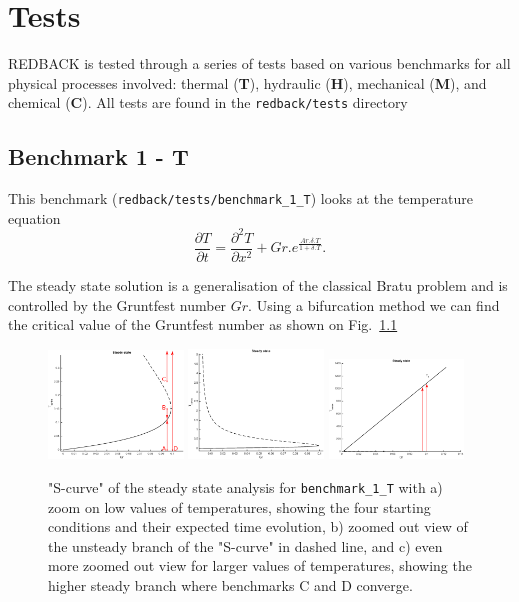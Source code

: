 \documentclass[]{scrreprt}
\newcommand{\redback}{{REDBACK}}
\begin{document}
\chapter{Tests}
\label{chapter:tests}

\redback{} is tested through a series of tests based on various benchmarks for all physical processes involved: thermal (\textbf{T}), hydraulic (\textbf{H}), mechanical (\textbf{M}), and chemical (\textbf{C}). All tests are found in the \texttt{redback/tests} directory
\section{Benchmark 1 - T}

This benchmark (\texttt{redback/tests/benchmark\_1\_T}) looks at the temperature equation 
\begin{equation}
\frac{\partial T}{\partial t} = \frac{\partial^2 T}{\partial x^2} + Gr . e^{\frac{Ar. \delta.T}{1+\delta.T}}.
\end{equation}

The steady state solution is a generalisation of the classical Bratu problem \citep{Bratu1914} and is controlled by the Gruntfest number $Gr$. Using a bifurcation method \citep{Succombe2015} we can find the critical value of the Gruntfest number as shown on Fig.~\ref{fig:benchmark_1_T_succombe}

\begin{figure}
  \centering
  \includegraphics[width=0.32\textwidth]{benchmark_1_T_succombe_0}
  \includegraphics[width=0.32\textwidth]{benchmark_1_T_succombe_1}
  \includegraphics[width=0.32\textwidth]{benchmark_1_T_succombe_2}
  \caption{"S-curve" of the steady state analysis for \texttt{benchmark\_1\_T} with a) zoom on low values of temperatures, showing the four starting conditions and their expected time evolution, b) zoomed out view of the unsteady branch of the "S-curve" in dashed line, and c) even more zoomed out view for larger values of temperatures, showing the higher steady branch where benchmarks C and D converge.}
  \label{fig:benchmark_1_T_succombe}
\end{figure}
\end{document}
